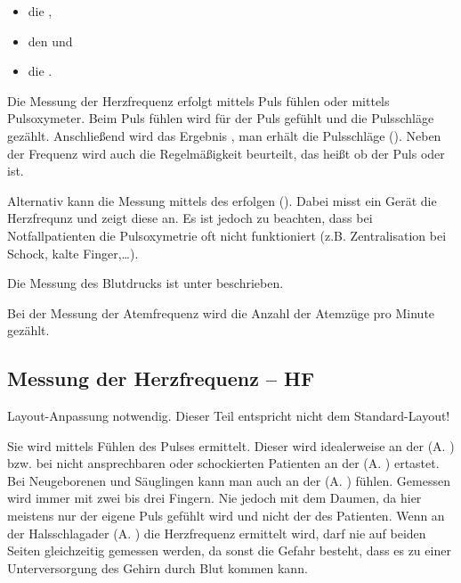 \begin{itemize}
\item die , 
\item den  und 
\item die .
\end{itemize}

Die Messung der Herzfrequenz erfolgt mittels Puls fühlen oder
mittels Pulsoxymeter. Beim Puls fühlen wird für
 der Puls gefühlt und die Pulsschläge
gezählt. Anschließend wird das Ergebnis , man erhält die Pulsschläge 
(). Neben der Frequenz wird auch die
Regelmäßigkeit beurteilt, das heißt ob der Puls  oder  ist.

Alternativ kann die Messung mittels des 
erfolgen (). Dabei misst ein
Gerät die Herzfrequnz und zeigt diese an. Es ist jedoch zu
beachten, dass bei Notfallpatienten die Pulsoxymetrie oft
nicht funktioniert (z.B. Zentralisation bei Schock, kalte Finger,\ldots).

Die Messung des Blutdrucks ist unter  beschrieben.

Bei der Messung der Atemfrequenz wird die Anzahl der Atemzüge pro Minute gezählt.







\subsection{Messung der Herzfrequenz -- HF}
\label{topic:pulsmessung}
\begin{anfxwarning}[author=GABS]{Layout-Anpassung notwendig.}
   Dieser Teil entspricht nicht dem Standard-Layout!
\end{anfxwarning}

 

Sie wird mittels Fühlen des Pulses
ermittelt.  
Dieser wird idealerweise an der
 (A. ) bzw. bei nicht
ansprechbaren oder schockierten Patienten an der
 (A. ) ertastet. Bei
Neugeborenen und Säuglingen kann man auch an der
 (A. ) fühlen. Gemessen
wird immer mit zwei bis drei Fingern. Nie jedoch mit dem Daumen, da hier meistens nur der eigene Puls gefühlt wird und nicht der des
Patienten. Wenn an der Halsschlagader (A. ) die
Herzfrequenz ermittelt wird, darf nie auf beiden Seiten
gleichzeitig gemessen werden, da sonst die Gefahr besteht,
dass es zu einer Unterversorgung des Gehirn durch Blut kommen
kann.

